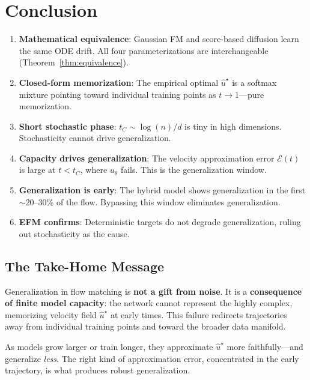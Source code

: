 \documentclass[11pt, a4paper]{article}
\theoremstyle{plain}
\theoremstyle{definition}
\theoremstyle{remark}
\begin{document}
\section{Conclusion}
\label{sec:conclusion}

\begin{tcolorbox}[colback=lightblue,colframe=mainblue,arc=4pt,title={\textbf{Summary of Core Results}},fonttitle=\bfseries]
\begin{enumerate}
  \item \textbf{Mathematical equivalence}: Gaussian FM and score-based diffusion learn the same ODE drift. All four parameterizations are interchangeable (Theorem~\ref{thm:equivalence}).
  \item \textbf{Closed-form memorization}: The empirical optimal $\hat{u}^\star$ is a softmax mixture pointing toward individual training points as $t \to 1$---pure memorization.
  \item \textbf{Short stochastic phase}: $t_C \sim \log(n)/d$ is tiny in high dimensions. Stochasticity cannot drive generalization.
  \item \textbf{Capacity drives generalization}: The velocity approximation error $\mathcal{E}(t)$ is large at $t < t_C$, where $u_\theta$ fails. This is the generalization window.
  \item \textbf{Generalization is early}: The hybrid model shows generalization in the first $\sim$20--30\% of the flow. Bypassing this window eliminates generalization.
  \item \textbf{EFM confirms}: Deterministic targets do not degrade generalization, ruling out stochasticity as the cause.
\end{enumerate}
\end{tcolorbox}

\subsection{The Take-Home Message}

Generalization in flow matching is \textbf{not a gift from noise}. It is a \textbf{consequence of finite model capacity}: the network cannot represent the highly complex, memorizing velocity field $\hat{u}^\star$ at early times. This failure redirects trajectories away from individual training points and toward the broader data manifold.

As models grow larger or train longer, they approximate $\hat{u}^\star$ more faithfully---and generalize \emph{less}. The right kind of approximation error, concentrated in the early trajectory, is what produces robust generalization.
\end{document}
